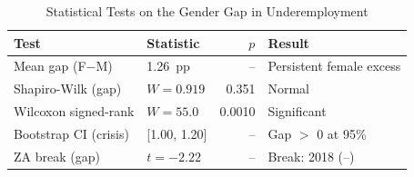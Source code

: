 \begin{table}[ht]
\caption{Statistical Tests on the Gender Gap in Underemployment}
\label{tab:gender_gap_tests}
\footnotesize
\begin{tabular}{llrl}
\toprule
\textbf{Test} & \textbf{Statistic} & \textbf{$p$} & \textbf{Result}\\
\midrule
Mean gap (F$-$M) & 1.26~pp & -- & Persistent female excess\\
Shapiro-Wilk (gap) & $W=0.919$ & 0.351 & Normal\\
Wilcoxon signed-rank & $W=55.0$ & 0.0010 & Significant\\
Bootstrap CI (crisis) & [1.00, 1.20] & -- & Gap $>$ 0 at 95\%\\
ZA break (gap) & $t=-2.22$ & -- & Break: 2018 (--)\\
\bottomrule
\end{tabular}
\end{table}
